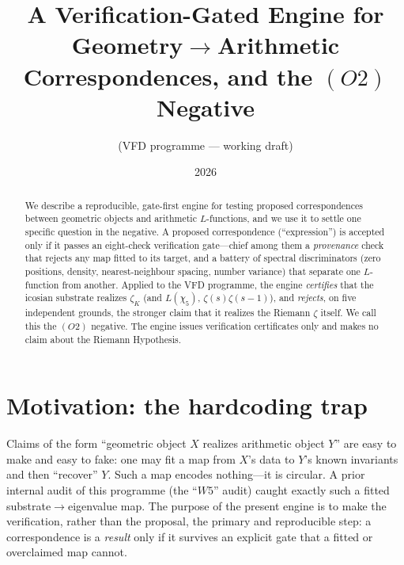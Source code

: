 \documentclass[11pt]{article}
\title{A Verification-Gated Engine for Geometry$\to$Arithmetic\\ Correspondences,
and the $(O2)$ Negative}
\author{(VFD programme --- working draft)}
\date{2026}
\theoremstyle{definition}
\newcommand{\zetaK}{\zeta_{K}}
\begin{document}
\maketitle

\begin{abstract}
We describe a reproducible, gate-first engine for testing proposed correspondences
between geometric objects and arithmetic $L$-functions, and we use it to settle one
specific question in the negative. A proposed correspondence (``expression'') is
accepted only if it passes an eight-check verification gate---chief among them a
\emph{provenance} check that rejects any map fitted to its target, and a battery of
spectral discriminators (zero positions, density, nearest-neighbour spacing, number
variance) that separate one $L$-function from another. Applied to the VFD programme,
the engine \emph{certifies} that the icosian substrate realizes $\zetaK$ (and
$L(\chi_5)$, $\zeta(s)\zeta(s-1)$), and \emph{rejects}, on five independent grounds,
the stronger claim that it realizes the Riemann $\zeta$ itself. We call this the
$(O2)$ negative. The engine issues verification certificates only and makes no
claim about the Riemann Hypothesis.
\end{abstract}

\section{Motivation: the hardcoding trap}
Claims of the form ``geometric object $X$ realizes arithmetic object $Y$'' are easy
to make and easy to fake: one may fit a map from $X$'s data to $Y$'s known invariants
and then ``recover'' $Y$. Such a map encodes nothing---it is circular. A prior
internal audit of this programme (the ``$W5$'' audit) caught exactly such a fitted
substrate$\to$eigenvalue map. The purpose of the present engine is to make the
verification, rather than the proposal, the primary and reproducible step: a
correspondence is a \emph{result} only if it survives an explicit gate that a fitted
or overclaimed map cannot.
\end{document}
